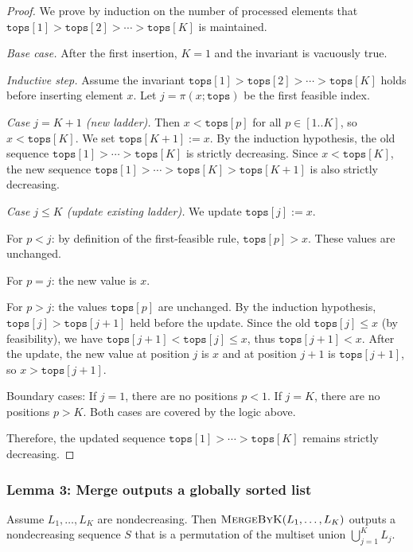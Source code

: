 \documentclass[12pt,a4paper]{article}
\theoremstyle{plain}
\theoremstyle{definition}
\newcommand{\tops}{\texttt{tops}}
\begin{document}
\begin{proof}
We prove by induction on the number of processed elements that
$\tops[1] > \tops[2] > \cdots > \tops[K]$ is maintained.

\emph{Base case.} After the first insertion, $K=1$ and the invariant is vacuously true.

\emph{Inductive step.} Assume the invariant $\tops[1] > \tops[2] > \cdots > \tops[K]$ holds
before inserting element $x$. Let $j = \pi(x; \tops)$ be the first feasible index.

\textit{Case $j = K+1$ (new ladder).}
Then $x < \tops[p]$ for all $p \in [1..K]$, so $x < \tops[K]$.
We set $\tops[K+1] := x$. By the induction hypothesis, the old sequence
$\tops[1] > \cdots > \tops[K]$ is strictly decreasing. Since $x < \tops[K]$,
the new sequence $\tops[1] > \cdots > \tops[K] > \tops[K+1]$ is also strictly decreasing.

\textit{Case $j \le K$ (update existing ladder).}
We update $\tops[j] := x$.

For $p < j$: by definition of the first-feasible rule, $\tops[p] > x$. These values are unchanged.

For $p = j$: the new value is $x$.

For $p > j$: the values $\tops[p]$ are unchanged. By the induction hypothesis,
$\tops[j] > \tops[j+1]$ held before the update. Since the old $\tops[j] \le x$
(by feasibility), we have $\tops[j+1] < \tops[j] \le x$, thus $\tops[j+1] < x$.
After the update, the new value at position $j$ is $x$ and at position $j+1$ is $\tops[j+1]$,
so $x > \tops[j+1]$.

Boundary cases: If $j=1$, there are no positions $p<1$. If $j=K$, there are no positions $p>K$.
Both cases are covered by the logic above.

Therefore, the updated sequence $\tops[1] > \cdots > \tops[K]$ remains strictly decreasing.
\end{proof}

\subsubsection{Lemma 3: Merge outputs a globally sorted list}
\label{lem:merge_sorted}
Assume $L_1, \dots, L_K$ are nondecreasing.  Then
$\textsc{MergeByK}(L_1, \dots, L_K)$ outputs a nondecreasing sequence $S$
that is a permutation of the multiset union $\bigcup_{j=1}^K L_j$.
\end{document}

